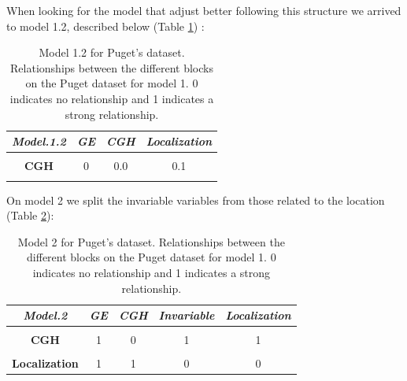 \documentclass[
  12pt,
  a4paper,
  twoside,
  openright]{book}
\begin{document}
When looking for the model that adjust better following this structure we arrived to model 1.2, described below (Table \ref{tab:puget-model1-2}) :

\begin{table}[H]

\caption[Model 1.2 for Puget's dataset.]{\label{tab:puget-model1-2}Model 1.2 for Puget's dataset. Relationships between the different blocks on the Puget dataset for model 1. 0 indicates no relationship and 1 indicates a strong relationship.}
\centering
\begin{tabular}[t]{|>{}c|c|c|>{}c|}
\hline
\em{\textbf{Model.1.2}} & \em{\textbf{GE}} & \em{\textbf{CGH}} & \em{\textbf{Localization}}\\
\hline
\textbf{\cellcolor{gray!6}{GE}} & \cellcolor{gray!6}{0} & \cellcolor{gray!6}{0.0} & \cellcolor{gray!6}{1.0}\\
\hline
\textbf{CGH} & 0 & 0.0 & 0.1\\
\hline
\textbf{\cellcolor{gray!6}{Localization}} & \cellcolor{gray!6}{1} & \cellcolor{gray!6}{0.1} & \cellcolor{gray!6}{0.0}\\
\hline
\end{tabular}
\end{table}

On model 2 we split the invariable variables from those related to the location (Table \ref{tab:puget-model2}):

\begin{table}[H]

\caption[Model 2 for Puget's dataset.]{\label{tab:puget-model2}Model 2 for Puget's dataset. Relationships between the different blocks on the Puget dataset for model 1. 0 indicates no relationship and 1 indicates a strong relationship.}
\centering
\begin{tabular}[t]{|>{}c|c|c|c|>{}c|}
\hline
\em{\textbf{Model.2}} & \em{\textbf{GE}} & \em{\textbf{CGH}} & \em{\textbf{Invariable}} & \em{\textbf{Localization}}\\
\hline
\textbf{\cellcolor{gray!6}{GE}} & \cellcolor{gray!6}{0} & \cellcolor{gray!6}{1} & \cellcolor{gray!6}{1} & \cellcolor{gray!6}{1}\\
\hline
\textbf{CGH} & 1 & 0 & 1 & 1\\
\hline
\textbf{\cellcolor{gray!6}{Invariable}} & \cellcolor{gray!6}{1} & \cellcolor{gray!6}{1} & \cellcolor{gray!6}{0} & \cellcolor{gray!6}{0}\\
\hline
\textbf{Localization} & 1 & 1 & 0 & 0\\
\hline
\end{tabular}
\end{table}
\end{document}
